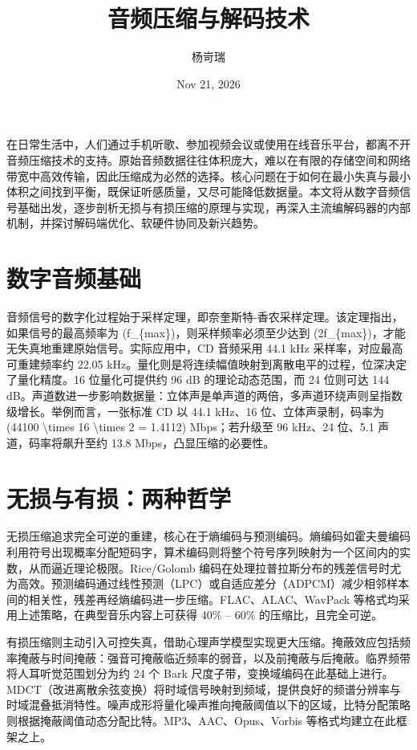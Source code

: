 \title{音频压缩与解码技术}
\author{杨岢瑞}
\date{Nov 21, 2026}
\maketitle
在日常生活中，人们通过手机听歌、参加视频会议或使用在线音乐平台，都离不开音频压缩技术的支持。原始音频数据往往体积庞大，难以在有限的存储空间和网络带宽中高效传输，因此压缩成为必然的选择。核心问题在于如何在最小失真与最小体积之间找到平衡，既保证听感质量，又尽可能降低数据量。本文将从数字音频信号基础出发，逐步剖析无损与有损压缩的原理与实现，再深入主流编解码器的内部机制，并探讨解码端优化、软硬件协同及新兴趋势。\par
\chapter{数字音频基础}
音频信号的数字化过程始于采样定理，即奈奎斯特-香农采样定理。该定理指出，如果信号的最高频率为 (f\_{}\{{}max\}{})，则采样频率必须至少达到 (2f\_{}\{{}max\}{})，才能无失真地重建原始信号。实际应用中，CD 音频采用 44.1 kHz 采样率，对应最高可重建频率约 22.05 kHz。量化则是将连续幅值映射到离散电平的过程，位深决定了量化精度。16 位量化可提供约 96 dB 的理论动态范围，而 24 位则可达 144 dB。声道数进一步影响数据量：立体声是单声道的两倍，多声道环绕声则呈指数级增长。举例而言，一张标准 CD 以 44.1 kHz、16 位、立体声录制，码率为 (44100 \textbackslash{}times 16 \textbackslash{}times 2 = 1.4112) Mbps；若升级至 96 kHz、24 位、5.1 声道，码率将飙升至约 13.8 Mbps，凸显压缩的必要性。\par
\chapter{无损与有损：两种哲学}
无损压缩追求完全可逆的重建，核心在于熵编码与预测编码。熵编码如霍夫曼编码利用符号出现概率分配短码字，算术编码则将整个符号序列映射为一个区间内的实数，从而逼近理论极限。Rice/Golomb 编码在处理拉普拉斯分布的残差信号时尤为高效。预测编码通过线性预测（LPC）或自适应差分（ADPCM）减少相邻样本间的相关性，残差再经熵编码进一步压缩。FLAC、ALAC、WavPack 等格式均采用上述策略，在典型音乐内容上可获得 40\%{} – 60\%{} 的压缩比，且完全可逆。\par
有损压缩则主动引入可控失真，借助心理声学模型实现更大压缩。掩蔽效应包括频率掩蔽与时间掩蔽：强音可掩蔽临近频率的弱音，以及前掩蔽与后掩蔽。临界频带将人耳听觉范围划分为约 24 个 Bark 尺度子带，变换域编码在此基础上进行。MDCT（改进离散余弦变换）将时域信号映射到频域，提供良好的频谱分辨率与时域混叠抵消特性。噪声成形将量化噪声推向掩蔽阈值以下的区域，比特分配策略则根据掩蔽阈值动态分配比特。MP3、AAC、Opus、Vorbis 等格式均建立在此框架之上。\par
